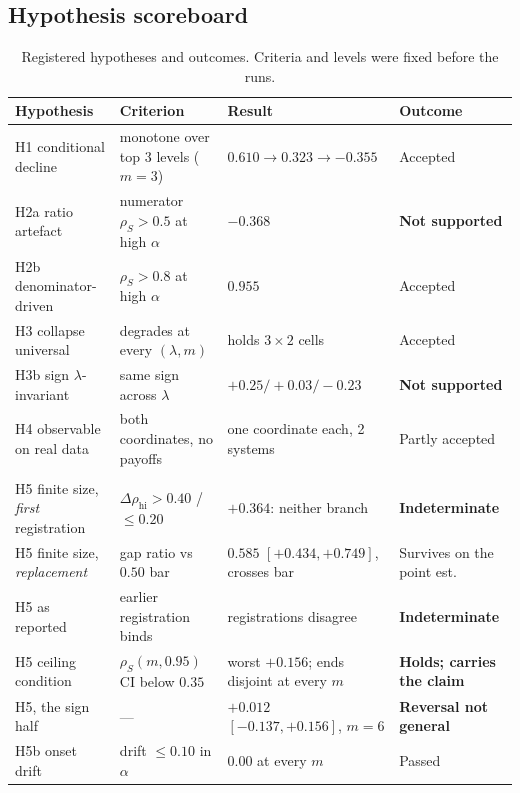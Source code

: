 \subsection{Hypothesis scoreboard}
\begin{table}[H]
\caption{Registered hypotheses and outcomes. Criteria and levels were fixed before the runs.}
\label{tab:scoreboard}
\scriptsize
\setlength{\tabcolsep}{2.5pt}
\begin{tabular}{@{}>{\raggedright\arraybackslash}p{3.5cm}>{\raggedright\arraybackslash}p{4.3cm}>{\raggedright\arraybackslash}p{5.1cm}>{\raggedright\arraybackslash}p{2.5cm}@{}}
\toprule
\textbf{Hypothesis} & \textbf{Criterion} & \textbf{Result} & \textbf{Outcome} \\
\midrule
H1 conditional decline & monotone over top 3 levels ($m{=}3$) & $0.610\to0.323\to-0.355$ & Accepted \\
H2a ratio artefact & numerator $\rho_S>0.5$ at high $\alpha$ & $-0.368$ & \textbf{Not supported} \\
H2b denominator-driven & $\rho_S>0.8$ at high $\alpha$ & $0.955$ & Accepted \\
H3 collapse universal & degrades at every $(\lambda,m)$ & holds $3\times2$ cells & Accepted \\
H3b sign $\lambda$-invariant & same sign across $\lambda$ & $+0.25/+0.03/-0.23$ & \textbf{Not supported} \\
H4 observable on real data & both coordinates, no payoffs & one coordinate each, 2 systems & Partly accepted \\
\midrule
\multicolumn{4}{l}{\emph{Kill-shots, registered before the experiment existed}}\\
H5 finite size, \emph{first} registration & $\Delta\rho_{\mathrm{hi}}>0.40$ / $\le0.20$ & $+0.364$: neither branch & \textbf{Indeterminate} \\
H5 finite size, \emph{replacement} & gap ratio vs $0.50$ bar & $0.585$ $[+0.434,+0.749]$, crosses bar & Survives on the point est. \\
H5 as reported & earlier registration binds & registrations disagree & \textbf{Indeterminate} \\
H5 ceiling condition & $\rho_S(m,0.95)$ CI below $0.35$ & worst $+0.156$; ends disjoint at every $m$ & \textbf{Holds; carries the claim} \\
H5, the sign half & --- & $+0.012$ $[-0.137,+0.156]$, $m{=}6$ & \textbf{Reversal not general} \\
H5b onset drift & drift $\le0.10$ in $\alpha$ & $0.00$ at every $m$ & Passed \\

\end{tabular}
\end{table}
